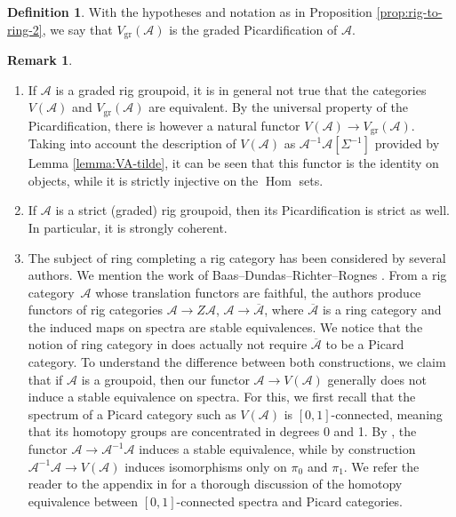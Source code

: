 \documentclass[11pt]{article}
\newcommand{\skpt}{\smallskip}
\theoremstyle{plain}
\theoremstyle{definition}
\newtheorem{definition}[theorem]{Definition}
\newtheorem{remark}[theorem]{Remark}
\newcommand{\Acal}{\mathcal A}
\DeclareMathOperator{\Hom}{Hom}
\let\ov\overline
\begin{document}
\begin{definition}\label{def:gr-picardification}
With the hypotheses and notation as in Proposition \ref{prop:rig-to-ring-2}, we say that $V_{\mathrm{gr}}(\Acal)$ is the graded Picardification of $\Acal$.
\end{definition}

\skpt
\begin{remark}\label{rem:picardification}
\begin{enumerate}
\item\label{item:rem-picardification-1} If $\Acal$ is a graded rig groupoid, it is in general not true that the categories $V(\Acal)$ and $V_{\mathrm{gr}}(\Acal)$ are equivalent. By the universal property of the Picardification, there is however a natural functor $V(\Acal)\to V_{\mathrm{gr}}(\Acal)$. Taking into account the description of $V(\Acal)$ as $\Acal^{-1}\Acal[\Sigma^{-1}]$ provided by Lemma \ref{lemma:VA-tilde}, it can be seen that this functor is the identity on objects, while it is strictly injective on the $\Hom$ sets.
\item If $\Acal$ is a strict (graded) rig groupoid, then its Picardification is strict as well. In particular, it is strongly coherent.
\item\label{rem:picardification-3} The subject of ring completing a rig category has been considered by several authors. We mention the work of Baas--Dundas--Richter--Rognes \cite{BDRR}. From a rig \hbox{category}~$\Acal$ whose translation functors are faithful, the authors produce functors of rig categories $\Acal\to Z\Acal$, $\Acal\to\ov{\Acal}$, where $\ov{\Acal}$ is a ring category and the induced maps on spectra are stable equivalences. We notice that the notion of ring category in \cite{BDRR} does actually not require $\ov{\Acal}$ to be a Picard category. To understand the difference between both constructions, we claim that if $\Acal$ is a groupoid, then our functor $\Acal\to V(\Acal)$ generally does not induce a stable equivalence on spectra. For this, we first recall that the spectrum of a Picard category such as $V(\Acal)$ is $[0,1]$-connected, meaning that its homotopy groups are concentrated in degrees 0 and 1. By \cite[pp.\,1657--1658]{ThomasonSpectral}, the functor $\Acal\to\Acal^{-1}\Acal$ induces a stable equivalence, while by construction $\Acal^{-1}\Acal\to V(\Acal)$ induces isomorphisms only on $\pi_{0}$ and $\pi_{1}$. We refer the reader to the appendix in \cite{Patel} for a thorough discussion of the homotopy equivalence between $[0,1]$-connected spectra and Picard categories.
\end{enumerate}
\end{remark}
\end{document}
